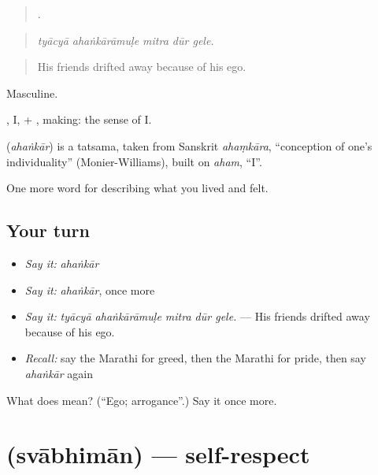 \begin{quote}
    .
\end{quote}

\begin{quote}
\emph{tyācyā ahaṅkārāmuḷe mitra dūr gele.}
\end{quote}

\begin{quote}
His friends drifted away because of his ego.
\end{quote}

Masculine.

, I, + , making: the sense of I.

\begin{cousinweb}
\textbf{} (\emph{ahaṅkār}) is a tatsama, taken from Sanskrit \emph{ahaṃkāra}, \textquotedblleft{}conception of one's individuality\textquotedblright{} (Monier-Williams), built on \emph{aham}, \textquotedblleft{}I\textquotedblright{}.
\end{cousinweb}

\begin{grammarlens}[title={What you've built}]
One more word for describing what you lived and felt.
\end{grammarlens}

\subsection*{Your turn}
\begin{itemize}
\raggedright
  \item \emph{Say it:} \emph{ahaṅkār}
  \item \emph{Say it:} \emph{ahaṅkār}, once more
  \item \emph{Say it:} \emph{tyācyā ahaṅkārāmuḷe mitra dūr gele.} — His friends drifted away because of his ego.
  \item \emph{Recall:} say the Marathi for greed, then the Marathi for pride, then say \emph{ahaṅkār} again
\end{itemize}

\begin{tcolorbox}[breakable,colback=teal!4,colframe=teal!35!black,title={Before you move on}]
What does  mean? (\textquotedblleft{}Ego; arrogance\textquotedblright{}.) Say it once more.
\end{tcolorbox}
\section[\texorpdfstring{\mr{स्वाभिमान} (svābhimān)}{स्वाभिमान (svābhimān)}]{ (svābhimān) — self-respect}

